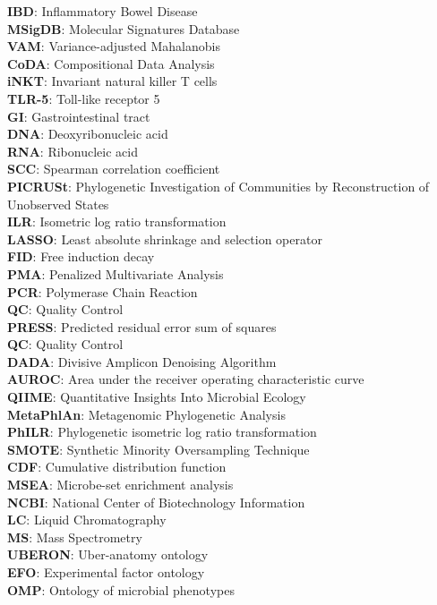 \noindent \textbf{IBD}: Inflammatory Bowel Disease \\
\noindent \textbf{MSigDB}: Molecular Signatures Database \\
\noindent \textbf{VAM}: Variance-adjusted Mahalanobis \\
\noindent \textbf{CoDA}: Compositional Data Analysis \\
\noindent \textbf{iNKT}: Invariant natural killer T cells \\
\noindent \textbf{TLR-5}: Toll-like receptor 5 \\
\noindent \textbf{GI}: Gastrointestinal tract \\
\noindent \textbf{DNA}: Deoxyribonucleic acid \\
\noindent \textbf{RNA}: Ribonucleic acid \\
\noindent \textbf{SCC}: Spearman correlation coefficient \\
\noindent \textbf{PICRUSt}: Phylogenetic Investigation of Communities by Reconstruction of Unobserved States \\
\noindent \textbf{ILR}: Isometric log ratio transformation \\
\noindent \textbf{LASSO}: Least absolute shrinkage and selection operator \\
\noindent \textbf{FID}: Free induction decay \\
\noindent \textbf{PMA}: Penalized Multivariate Analysis \\
\noindent \textbf{PCR}: Polymerase Chain Reaction \\
\noindent \textbf{QC}: Quality Control \\
\noindent \textbf{PRESS}: Predicted residual error sum of squares \\
\noindent \textbf{QC}: Quality Control \\
\noindent \textbf{DADA}: Divisive Amplicon Denoising Algorithm \\
\noindent \textbf{AUROC}: Area under the receiver operating characteristic curve \\
\noindent \textbf{QIIME}:  Quantitative Insights Into Microbial Ecology \\
\noindent \textbf{MetaPhlAn}: Metagenomic Phylogenetic Analysis \\
\noindent \textbf{PhILR}: Phylogenetic isometric log ratio transformation \\
\noindent \textbf{SMOTE}: Synthetic Minority Oversampling Technique \\
\noindent \textbf{CDF}: Cumulative distribution function \\
\noindent \textbf{MSEA}: Microbe-set enrichment analysis  \\
\noindent \textbf{NCBI}: National Center of Biotechnology Information \\
\noindent \textbf{LC}: Liquid Chromatography \\
\noindent \textbf{MS}: Mass Spectrometry \\
\noindent \textbf{UBERON}:  Uber-anatomy ontology \\
\noindent \textbf{EFO}: Experimental factor ontology \\
\noindent \textbf{OMP}: Ontology of microbial phenotypes \\

